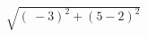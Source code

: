\documentclass[preview]{standalone}
\begin{document}
\begin{align*}
\sqrt{ ( \  - 3 ) ^{2} + ( 5 - 2 ) ^{2}}
\end{align*}
\end{document}
